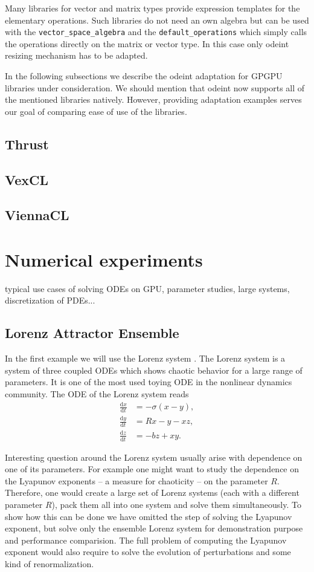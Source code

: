 \documentclass[1p]{elsarticle}
\newcommand{\code}[1]{\lstinline|#1|}
\newcommand {\de} {\mbox{d}}
\begin{document}
Many libraries for vector and matrix types provide expression templates for the
elementary operations. Such libraries do not need an own algebra but can be
used with the \code{vector_space_algebra} and the \code{default_operations}
which simply calls the operations directly on the matrix or vector type. In
this case only odeint resizing mechanism has to be adapted.

In the following subsections we describe the odeint adaptation for GPGPU libraries
under consideration. We should mention that odeint now supports all of the
mentioned libraries natively. However, providing adaptation examples serves our
goal of comparing ease of use of the libraries.

\subsection{Thrust}
\subsection{VexCL}
\subsection{ViennaCL}

\section{Numerical experiments}

typical use cases of solving ODEs on GPU, parameter studies, large systems, discretization of PDEs...

\subsection{Lorenz Attractor Ensemble}

In the first example we will use the Lorenz system \cite{Lorenz}. The Lorenz system is a system of three coupled ODEs
which shows chaotic behavior for a large range of parameters. It is one of the most used toying ODE in the nonlinear dynamics community. The ODE of the Lorenz system reads
\begin{align}
    \frac{\de x}{\de t} &= -\sigma \left( x - y \right), \\
    \frac{\de y}{\de t} &= R x - y - xz, \\
    \frac{\de z}{\de t} &= -bz + xy.
\end{align}

Interesting question around the Lorenz system usually arise with dependence on one of its parameters. For example one might want to study the dependence on the Lyapunov exponents -- a measure for chaoticity -- on the parameter $R$. Therefore, one would create a large set of Lorenz systems (each with a different parameter $R$), pack them all into one system and solve them simultaneously. To show how this can be done we have omitted the step of solving the Lyapunov exponent, but solve only the ensemble Lorenz system for demonstration purpose and performance comparision. The full problem of computing the Lyapunov exponent would also require to solve the evolution of perturbations and some kind of renormalization. 
\end{document}
